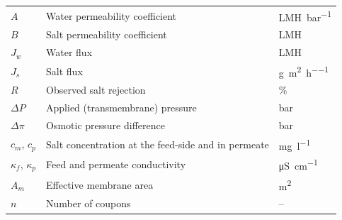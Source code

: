 \begin{tabular}{@{}lll@{}}
  $A$          & Water permeability coefficient & \unit{LMH.bar^{-1}} \\
  $B$          & Salt permeability coefficient  & \unit{LMH} \\
  $J_w$        & Water flux                     & \unit{LMH} \\
  $J_s$        & Salt flux                      & \unit{\gram\per\square\metre\per\hour} \\
  $R$          & Observed salt rejection        & \unit{\percent} \\
  $\Delta P$   & Applied (transmembrane) pressure & \unit{bar} \\
  $\Delta\pi$  & Osmotic pressure difference    & \unit{bar} \\
  $c_m$, $c_p$ & Salt concentration at the feed-side and in permeate & \unit{\milli\gram\per\litre} \\
  $\kappa_f$, $\kappa_p$ & Feed and permeate conductivity & \unit{\micro\siemens\per\centi\metre} \\
  $A_m$        & Effective membrane area        & \unit{\square\metre} \\
  $n$          & Number of coupons              & -- \\
\end{tabular}